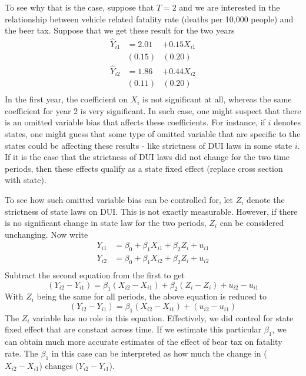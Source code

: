 \documentclass[12pt]{article}
\theoremstyle{definition}
\theoremstyle{property}
\theoremstyle{assumption}
\theoremstyle{example}
\theoremstyle{comment}
\begin{document}
To see why that is the case, suppose that $T=2$ and we are interested in the relationship between vehicle related fatality rate (deaths per 10,000 people) and the beer tax. Suppose that we get these result for the two years
\[
\begin{aligned}
\hat{Y}_{i1} &=2.01 &+ 0.15X_{i1}\\
                    &(0.15)&(0.20) \\
\hat{Y}_{i2} &=1.86 &+ 0.44X_{i2}\\
                    &(0.11)&(0.20) \\                    
\end{aligned}
\]
In the first year, the coefficient on $X_i$ is not significant at all, whereas the same coefficient for year 2 is very significant. In such case, one might suspect that there is an omitted variable bias that affects these coefficients. For instance, if $i$ denotes states, one might guess that some type of omitted variable that are specific to the states could be affecting these results - like strictness of DUI laws in some state $i$. If it is the case that the strictness of DUI laws did not change for the two time periods, then these effects qualify as a state fixed effect (replace cross section with state). \par\medskip 
To see how such omitted variable bias can be controlled for, let $Z_i$ denote the strictness of state laws on DUI. This is not exactly measurable. However, if there is no significant change in state law for the two periods, $Z_i$ can be considered unchanging. Now write
\[
\begin{aligned}
Y_{i1}& = \beta_0 + \beta_1X_{i1}+\beta_2 Z_{i}+u_{i1} \\                
Y_{i2}& = \beta_0 + \beta_1X_{i2}+\beta_2 Z_{i}+u_{i2} \\                
\end{aligned}
\]
Subtract the second equation from the first to get
\[
(Y_{i2}-Y_{i1}) = \beta_1(X_{i2}-X_{i1}) +\beta_2(Z_{i}-Z_{i}) + u_{i2}-u_{i1}
\]
With $Z_i$ being the same for all periods, the above equation is reduced to
\[
(Y_{i2}-Y_{i1}) = \beta_1(X_{i2}-X_{i1}) +(u_{i2}-u_{i1})
\]
The $Z_i$ variable has no role in this equation. Effectively, we did control for state fixed effect that are constant across time. If we estimate this particular $\beta_1$, we can obtain much more accurate estimates of the effect of bear tax on fatality rate. The $\beta_1$ in this case can be interpreted as how much the change in ($X_{i2}-X_{i1}$) changes ($Y_{i2}-Y_{i1}$). \par\medskip
\end{document}
